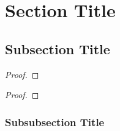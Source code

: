 \section{Section Title}

\begin{defn}
    \lipsum[1]
\end{defn}

\begin{rmrk}
    \lipsum[1]
\end{rmrk}

\begin{exmp}
    \lipsum[1]
\end{exmp}

\subsection{Subsection Title}

\begin{thrm}
    \lipsum[1]
\end{thrm}

\begin{proof}
    \lipsum[1]
\end{proof}

\begin{coro}
    \lipsum[1]
\end{coro}

\begin{proof}
    \lipsum[1]
\end{proof}

\subsubsection{Subsubsection Title}

\begin{defn}
    \lipsum[1]
\end{defn}

\begin{exmp}
    \lipsum[1]
\end{exmp}

\begin{defn}
    \lipsum[1]
\end{defn}

\begin{exmp}
    \lipsum[1]
\end{exmp}

\begin{rmrk}
    \lipsum[1]
\end{rmrk}

